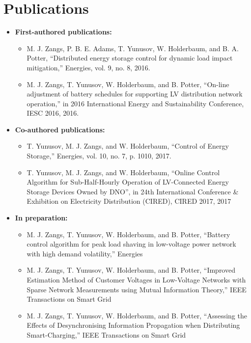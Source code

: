 \section{Publications}
\label{ch-introduction:sec:publications}


\begin{itemize}

\item \textbf{First-authored publications:}
\begin{itemize}
	\item M. J. Zangs, P. B. E. Adams, T. Yunusov, W. Holderbaum, and B. A. Potter, ``Distributed energy storage control for dynamic load impact mitigation,'' Energies, vol. 9, no. 8, 2016.
	\item M. J. Zangs, T. Yunusov, W. Holderbaum, and B. Potter, ``On-line adjustment of battery schedules for supporting LV distribution network operation,'' in 2016 International Energy and Sustainability Conference, IESC 2016, 2016.
\end{itemize}

\item \textbf{Co-authored publications:}
\begin{itemize}
	\item T. Yunusov, M. J. Zangs, and W. Holderbaum, ``Control of Energy Storage,'' Energies, vol. 10, no. 7, p. 1010, 2017.
	\item T. Yunusov, M. J. Zangs, and W. Holderbaum, ``Online Control Algorithm for Sub-Half-Hourly Operation of LV-Connected Energy Storage Devices Owned by DNO'', in 24th International Conference \& Exhibition on Electricity Distribution (CIRED), CIRED 2017, 2017
\end{itemize}

\item \textbf{In preparation:}
\begin{itemize}
	\item M. J. Zangs, T. Yunusov, W. Holderbaum, and B. Potter, ``Battery control algorithm for peak load shaving in low-voltage power network with high demand volatility,'' Energies
	\item M. J. Zangs, T. Yunusov, W. Holderbaum, and B. Potter, ``Improved Estimation Method of Customer Voltages in Low-Voltage Networks with Sparse Network Measurements using Mutual Information Theory,'' IEEE Transactions on Smart Grid
	\item M. J. Zangs, T. Yunusov, W. Holderbaum, and B. Potter, ``Assessing the Effects of Desynchronising Information Propagation when Distributing Smart-Charging,'' IEEE Transactions on Smart Grid
\end{itemize}

\end{itemize}
